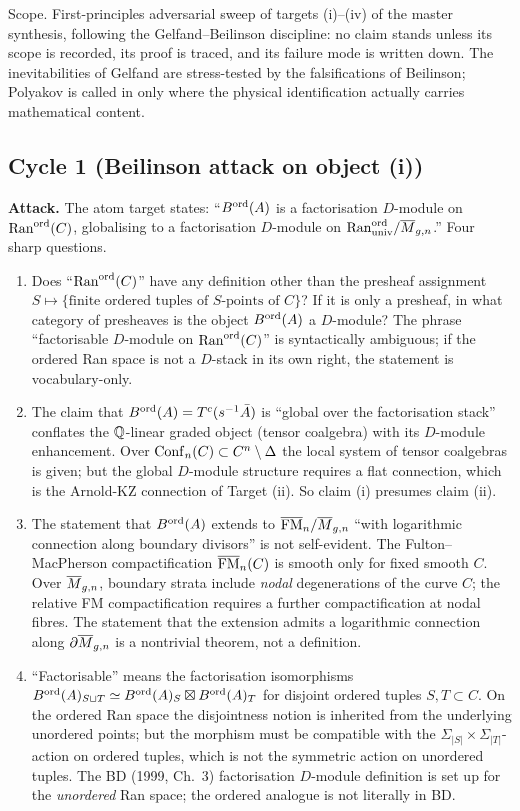 Scope. First-principles adversarial sweep of targets (i)--(iv) of the
master synthesis, following the Gelfand--Beilinson discipline: no claim
stands unless its scope is recorded, its proof is traced, and its
failure mode is written down. The inevitabilities of Gelfand are
stress-tested by the falsifications of Beilinson; Polyakov is called in
only where the physical identification actually carries mathematical
content.

\subsection*{Cycle 1 (Beilinson attack on object (i))}

\textbf{Attack.} The atom target states: ``$B^{\mathrm{ord}}(A)$ is a factorisation
$D$-module on $\mathrm{Ran}^{\mathrm{ord}}(C)$, globalising to a factorisation
$D$-module on $\mathrm{Ran}^{\mathrm{ord}}_{\mathrm{univ}} / \overline{M}_{g,n}$.''
Four sharp questions.

\begin{enumerate}
\item[Q1.] Does ``$\mathrm{Ran}^{\mathrm{ord}}(C)$'' have any definition other
than the presheaf assignment
$S \mapsto \{\text{finite ordered tuples of } S\text{-points of } C\}$?
If it is only a presheaf, in what category of presheaves is the object
$B^{\mathrm{ord}}(A)$ a $D$-module? The phrase ``factorisable $D$-module on
$\mathrm{Ran}^{\mathrm{ord}}(C)$'' is syntactically ambiguous; if the ordered
Ran space is not a $D$-stack in its own right, the statement is
vocabulary-only.
\item[Q2.] The claim that $B^{\mathrm{ord}}(A) = T^c(s^{-1} \bar A)$ is ``global
over the factorisation stack'' conflates the $\mathbb{Q}$-linear graded object
(tensor coalgebra) with its $D$-module enhancement. Over
$\mathrm{Conf}_n(C) \subset C^n \setminus \Delta$ the local system of tensor
coalgebras is given; but the global $D$-module structure requires a flat
connection, which is the Arnold-KZ connection of Target (ii). So claim
(i) presumes claim (ii).
\item[Q3.] The statement that $B^{\mathrm{ord}}(A)$ extends to
$\overline{\mathrm{FM}}_n / \overline{M}_{g,n}$ ``with logarithmic connection along
boundary divisors'' is not self-evident. The Fulton--MacPherson
compactification $\overline{\mathrm{FM}}_n(C)$ is smooth only for fixed smooth
$C$. Over $\overline{M}_{g,n}$, boundary strata include \emph{nodal}
degenerations of the curve $C$; the relative FM compactification
requires a further compactification at nodal fibres. The statement that
the extension admits a logarithmic connection along $\partial \overline{M}_{g,n}$
is a nontrivial theorem, not a definition.
\item[Q4.] ``Factorisable'' means the factorisation isomorphisms
$B^{\mathrm{ord}}(A)_{S \sqcup T} \simeq B^{\mathrm{ord}}(A)_S \boxtimes B^{\mathrm{ord}}(A)_T$ for
disjoint ordered tuples $S, T \subset C$. On the ordered Ran space the
disjointness notion is inherited from the underlying unordered points;
but the morphism must be compatible with the $\Sigma_{|S|} \times
\Sigma_{|T|}$-action on ordered tuples, which is not the symmetric action
on unordered tuples. The BD (1999, Ch.\ 3) factorisation $D$-module
definition is set up for the \emph{unordered} Ran space; the ordered
analogue is not literally in BD.
\end{enumerate}

